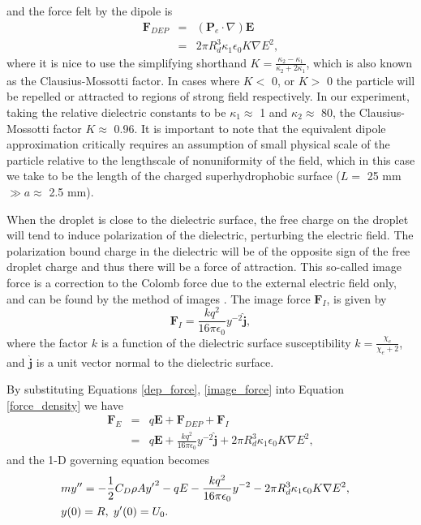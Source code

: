 \documentclass[12pt,a4paper,oneside]{book}
\begin{document}
and the force felt by the dipole is 
\begin{eqnarray} \label{dep_force}
\mathbf{F}_{DEP} &=& \left( \mathbf{P}_e \cdot \nabla \right) \mathbf{E} \nonumber \\
&=& 2 \pi R_d^3 \kappa_1 \epsilon_0 K \nabla E^2,
\end{eqnarray}
where it is nice to use the simplifying shorthand $K = \frac{\kappa_2 - \kappa_1}{\kappa_2 + 2 \kappa_1}$, which is also known as the Clausius-Mossotti factor. In cases where $K <$ 0, or $K>$ 0 the particle will be repelled or attracted to regions of strong field respectively. In our experiment, taking the relative dielectric constants to be $\kappa_1 \approx$ 1 and $\kappa_2 \approx$ 80, the Clausius-Mossotti factor $K \approx$ 0.96. It is important to note that the equivalent dipole approximation critically requires an assumption of small physical scale of the particle relative to the lengthscale of nonuniformity of the field, which in this case we take to be the length of the charged superhydrophobic surface ($L =$ 25 mm $\gg a \approx$ 2.5 mm).

When the droplet is close to the dielectric surface, the free charge on the droplet will tend to induce polarization of the dielectric, perturbing the electric field. The polarization bound charge in the dielectric will be of the opposite sign of the free droplet charge and thus there will be a force of attraction. This so-called image force is a correction to the Colomb force due to the external electric field only, and can be found by the method of images \cite{david_j._griffiths_introduction_1999}. The image force $\mathbf{F}_I$, is given by
\begin{equation}
\mathbf{F}_I = \frac{k q^2}{16 \pi \epsilon_0} y^{-2} \hat{\mathbf{j}},
\label{image_force}
\end{equation}
where the factor $k$ is a function of the dielectric surface susceptibility $k = \frac{\chi_e}{\chi_e + 2}$, and $\hat{\mathbf{j}}$ is a unit vector normal to the dielectric surface.

By substituting Equations \ref{dep_force}, \ref{image_force} into Equation \ref{force_density} we have
\begin{eqnarray*}
 \mathbf{F}_E &=& q \mathbf{E} + \mathbf{F}_{DEP} + \mathbf{F}_I \\
 &=& q \mathbf{E} + \frac{k q^2}{16 \pi \epsilon_0 } y^{-2} \hat{\mathbf{j}} + 2 \pi R_d^3 \kappa_1 \epsilon_0 K \nabla E^2, 
\end{eqnarray*}
and the 1-D governing equation becomes
\begin{eqnarray} \label{gov_eqn_subs}
&m y'' = - \frac{1}{2} C_D \rho A {y'}^2 - q E - \frac{k q^2}{16 \pi \epsilon_0} y^{-2}- 2 \pi R_d^3 \kappa_1 \epsilon_0 K \nabla E^2,& \nonumber \\
&y(0) = R, \hspace{1 mm} y'(0) = U_0 .&
\end{eqnarray}
\end{document}
